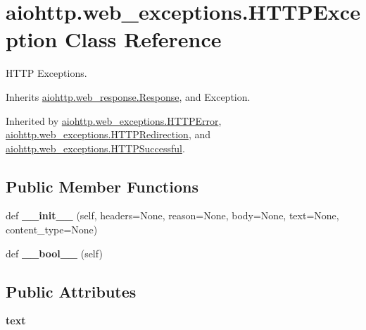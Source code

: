 \hypertarget{classaiohttp_1_1web__exceptions_1_1_h_t_t_p_exception}{}\section{aiohttp.\+web\+\_\+exceptions.\+H\+T\+T\+P\+Exception Class Reference}
\label{classaiohttp_1_1web__exceptions_1_1_h_t_t_p_exception}


H\+T\+TP Exceptions.  




Inherits \hyperlink{classaiohttp_1_1web__response_1_1_response}{aiohttp.\+web\+\_\+response.\+Response}, and Exception.



Inherited by \hyperlink{classaiohttp_1_1web__exceptions_1_1_h_t_t_p_error}{aiohttp.\+web\+\_\+exceptions.\+H\+T\+T\+P\+Error}, \hyperlink{classaiohttp_1_1web__exceptions_1_1_h_t_t_p_redirection}{aiohttp.\+web\+\_\+exceptions.\+H\+T\+T\+P\+Redirection}, and \hyperlink{classaiohttp_1_1web__exceptions_1_1_h_t_t_p_successful}{aiohttp.\+web\+\_\+exceptions.\+H\+T\+T\+P\+Successful}.

\subsection*{Public Member Functions}
\begin{DoxyCompactItemize}
\item 
\mbox{\label{classaiohttp_1_1web__exceptions_1_1_h_t_t_p_exception_a59e288bd5f3f0b46c2dddceb88f3bbb9}} 
def {\bfseries \+\_\+\+\_\+init\+\_\+\+\_\+} (self, headers=None, reason=None, body=None, text=None, content\+\_\+type=None)
\item 
\mbox{\label{classaiohttp_1_1web__exceptions_1_1_h_t_t_p_exception_a3e1e7fc46fa9576501a37d65a83c8e99}} 
def {\bfseries \+\_\+\+\_\+bool\+\_\+\+\_\+} (self)
\end{DoxyCompactItemize}
\subsection*{Public Attributes}
\begin{DoxyCompactItemize}
\item 
\mbox{\label{classaiohttp_1_1web__exceptions_1_1_h_t_t_p_exception_a48bca4f4c47627e3055c48e2bebf759d}} 
{\bfseries text}
\end{DoxyCompactItemize}
